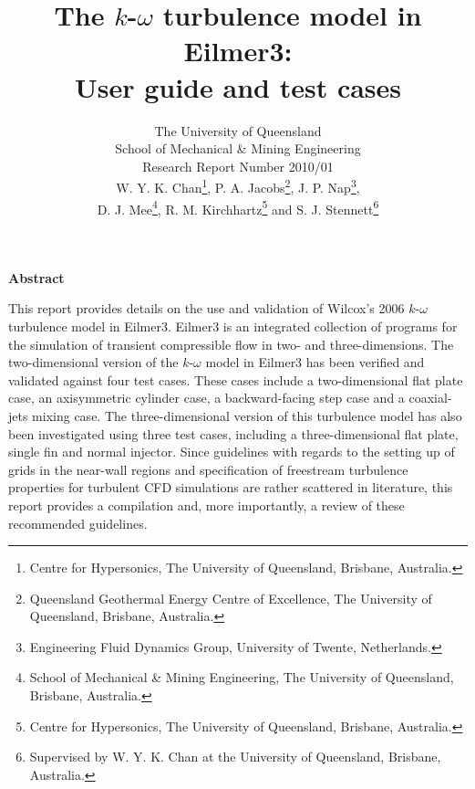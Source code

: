 \documentclass[12pt,a4paper]{article}
\title{
    The $k$-$\omega$ turbulence model in Eilmer3: \\
    User guide and test cases
}
\author{
    The University of Queensland \\
    School of Mechanical \& Mining Engineering \\
    Research Report Number 2010/01 
    \vspace{0.5cm} \\
    W. Y. K. Chan\thanks{Centre for Hypersonics, The University of 
     Queensland, Brisbane, Australia.}, 
    P. A. Jacobs\thanks{Queensland Geothermal Energy Centre of 
     Excellence, The University of Queensland, Brisbane, Australia.}, 
    J. P. Nap\thanks{Engineering Fluid Dynamics Group, University of Twente, Netherlands.}, \\ 
    D. J. Mee\thanks{School of Mechanical \& Mining Engineering, 
     The University of Queensland, Brisbane, Australia.},  
    R. M. Kirchhartz\thanks{Centre for Hypersonics, The University of
     Queensland, Brisbane, Australia.} and
    S. J. Stennett\thanks{Supervised by W. Y. K. Chan at the University of Queensland, Brisbane, Australia.} \\
}
\begin{document}
\maketitle

\centerline{\textbf{Abstract}}
\medskip
This report provides details on the use and validation of Wilcox's
2006 $k$-$\omega$ turbulence model in Eilmer3. Eilmer3 is an integrated
collection of programs for the simulation of transient compressible flow
in two- and three-dimensions\cite{Jacobs2008,Jacobs2010}. The two-dimensional 
version of the $k$-$\omega$ model in Eilmer3 has been verified and
validated against four test cases. These cases include a two-dimensional 
flat plate case, an axisymmetric cylinder case, a backward-facing step
case and a coaxial-jets mixing case. The three-dimensional version of this turbulence model has also been investigated using three test cases, including a three-dimensional flat plate, single fin and normal injector. 
Since guidelines with regards to the setting up of grids in the
near-wall regions and specification of freestream turbulence properties 
for turbulent CFD simulations are rather scattered in literature, this 
report provides a compilation and, more importantly, a review of these 
recommended guidelines. 
\newpage
\tableofcontents















\newpage

%

%

\newpage
\appendix
\end{document}
